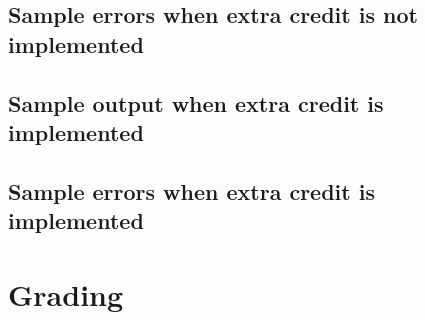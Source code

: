 \documentclass{article}
\begin{document}


\subsection{Sample errors when extra credit is not implemented}



\subsection{Sample output when extra credit is implemented}



\subsection{Sample errors when extra credit is implemented}





\section{Grading}
\end{document}
